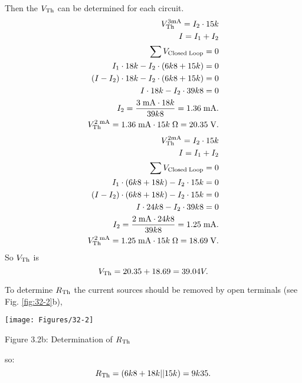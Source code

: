 \noindent Then the $V_{\rm Th}$ can be determined for each circuit.
\begin{equation}
\begin{split}
V_{\rm Th}^{\rm 3 mA} = I_2 \cdot 15k \\
I = I_1 + I_2 \\
\sum V_{\rm Closed \; Loop} = 0 \\
I_1 \cdot 18k - I_2 \cdot (6k8 + 15k) = 0 \\
(I - I_2) \cdot 18k - I_2 \cdot (6k8 + 15k) = 0 \\
I \cdot 18k - I_2 \cdot 39k8 = 0 \\
I_2 = \frac{3 \; {\rm mA} \cdot 18k}{39k8} = 1.36 \; {\rm mA}. \\
V_{\rm Th}^{\rm 2 \; mA} = 1.36 \; {\rm mA} \cdot 15k \; \Omega = 20.35 \; {\rm V}.
\end{split}
\end{equation}
\begin{equation}
\begin{split}
V_{\rm Th}^{\rm 2 mA} = I_2 \cdot 15k \\
I = I_1 + I_2 \\
\sum V_{\rm Closed \; Loop} = 0 \\
I_1 \cdot (6k8 + 18k) - I_2 \cdot 15k = 0 \\
(I - I_2) \cdot (6k8 + 18k) - I_2 \cdot 15k = 0 \\
I \cdot 24k8 - I_2 \cdot 39k8 = 0 \\
I_2 = \frac{2 \; {\rm mA} \cdot 24k8}{39k8} = 1.25 \; {\rm mA}. \\
V_{\rm Th}^{\rm 2 \; mA} = 1.25 \; {\rm mA} \cdot 15k \; \Omega = 18.69 \; {\rm V}.
\end{split}
\end{equation}
So $V_{\rm Th}$ is
\begin{equation}
V_{\rm Th} = 20.35 + 18.69 = 39.04 V.
\end{equation}

To determine $R_{\rm Th}$ the current sources should be removed by open terminals (see Fig. \ref{fig:32-2}b), 
\begin{center}
    \texttt{[image: Figures/32-2]}
 
    Figure 3.2b: Determination of $R_{\rm Th}$
    \label{fig:32-2} 
\end{center}



\noindent so:
\begin{equation}
R_{\rm Th} = (6k8 +18k || 15k) = 9k35.
\end{equation}
 
